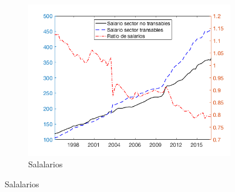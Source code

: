\documentclass{beamer}
\begin{document}
\begin{frame}
\begin{figure}
    ~ %
    \begin{subfigure}[b]{0.4\textwidth}
        \includegraphics[width=\textwidth]{fig13}
        \caption{\tiny Salalarios}
    \end{subfigure}
\end{figure}
\end{frame}
\end{document}
